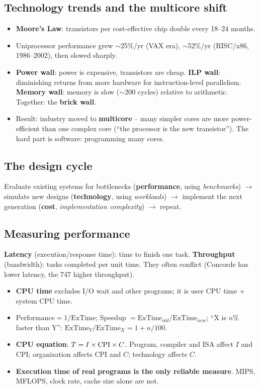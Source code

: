 \documentclass[11pt]{article}
\begin{document}
\subsection{Technology trends and the multicore shift}
\begin{itemize}[leftmargin=*]
  \item \textbf{Moore's Law}: transistors per cost-effective chip double
  every 18--24 months.
  \item Uniprocessor performance grew $\sim$25\%/yr (VAX era), $\sim$52\%/yr
  (RISC/x86, 1986--2002), then slowed sharply.
  \item \textbf{Power wall}: power is expensive, transistors are cheap.
  \textbf{ILP wall}: diminishing returns from more hardware for
  instruction-level parallelism. \textbf{Memory wall}: memory is slow
  ($\sim$200 cycles) relative to arithmetic. Together: the \textbf{brick
  wall}.
  \item Result: industry moved to \textbf{multicore} -- many simpler cores are
  more power-efficient than one complex core (``the processor is the new
  transistor''). The hard part is software: programming many cores.
\end{itemize}

\subsection{The design cycle}
Evaluate existing systems for bottlenecks (\textbf{performance}, using
\emph{benchmarks}) $\to$ simulate new designs (\textbf{technology}, using
\emph{workloads}) $\to$ implement the next generation (\textbf{cost},
\emph{implementation complexity}) $\to$ repeat.

\subsection{Measuring performance}
\begin{definition}
\textbf{Latency} (execution/response time): time to finish one task.
\textbf{Throughput} (bandwidth): tasks completed per unit time. They often
conflict (Concorde has lower latency, the 747 higher throughput).
\end{definition}
\begin{itemize}[leftmargin=*]
  \item \textbf{CPU time} excludes I/O wait and other programs; it is user
  CPU time $+$ system CPU time.
  \item $\text{Performance} = 1/\text{ExTime}$; Speedup $=
  \text{ExTime}_{old}/\text{ExTime}_{new}$; ``X is $n\%$ faster than Y'':
  $\text{ExTime}_Y/\text{ExTime}_X = 1+n/100$.
  \item \textbf{CPU equation}: $T = I\times\mathrm{CPI}\times C$. Program, compiler
  and ISA affect $I$ and CPI; organization affects CPI and $C$; technology
  affects $C$.
  \item \textbf{Execution time of real programs is the only reliable
  measure}. MIPS, MFLOPS, clock rate, cache size alone are not.
\end{itemize}
\end{document}
